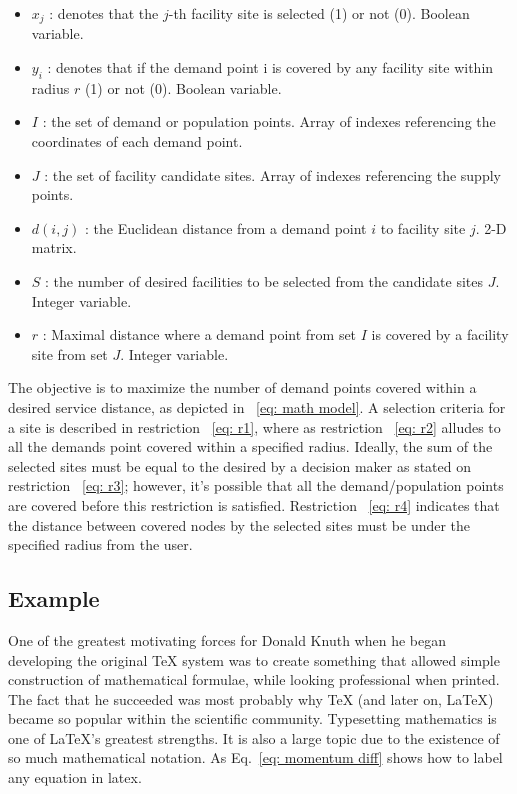\documentclass[11pt, a4paper]{article}
\begin{document}
\begin{itemize}
	\item $x_{j}$ : denotes that the $j$-th facility site is selected (1) or not (0). Boolean variable.
	\item $y_{i}$ : denotes that if the demand point i is covered by any facility site within radius $r$ (1) or not (0). Boolean variable.
	\item $I$ : the set of demand or population points. Array of indexes referencing the coordinates of each demand point.
	\item $J$ : the set of facility candidate sites. Array of indexes referencing the supply points.
	\item $d(i,j)$ : the Euclidean distance from a demand point $i$ to facility site $j$. 2-D matrix.
	\item $S$ : the number of desired facilities to be selected from the candidate sites $J$. Integer variable.
	\item $r$ : Maximal distance where a demand point from set $I$ is covered by a facility site from set $J$. Integer variable.
\end{itemize}
The objective is to maximize the number of demand points covered within a desired service distance, as depicted in ~\ref{eq: math model}.
A selection criteria for a site is described in restriction ~\ref{eq: r1}, where as restriction ~\ref{eq: r2} alludes to all the demands point covered within a specified radius. Ideally, the sum of the selected sites must be equal to the desired by a decision maker as stated on restriction ~\ref{eq: r3}; however, it's possible that all the demand/population points are covered before this restriction is satisfied. Restriction ~\ref{eq: r4} indicates that the distance between covered nodes by the selected sites must be under the specified radius from the user.

\subsection{Example}
One of the greatest motivating forces for Donald Knuth when he began developing the original TeX system was to create something that allowed simple construction of mathematical formulae, while looking professional when printed. The fact that he succeeded was most probably why TeX (and later on, LaTeX) became so popular within the scientific community. Typesetting mathematics is one of LaTeX's greatest strengths. It is also a large topic due to the existence of so much mathematical notation. As Eq.~\ref{eq: momentum diff} shows how to label any equation in latex. 
\end{document}
